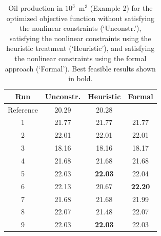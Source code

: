 \documentclass[twocolumn,numbook]{svjour3}          %
\begin{document}
\begin{table}
\centering
\caption{Oil production in $10^3$~m$^3$ (Example 2) for the optimized objective function
         without satisfying the nonlinear constraints (`Unconstr.'), satisfying the nonlinear constraints
         using the heuristic treatment (`Heuristic'), and satisfying the nonlinear constraints
         using the formal approach (`Formal'). Best feasible results shown in bold.}
\begin{tabular}{|c|c|c|c|}
\hline
  Run            &  Unconstr. & Heuristic & Formal      \\
\hline
Reference        & 20.29         &     20.28         & 	         \\
1 & 21.77      &     21.77         &       21.77    \\
2 & 22.01      &     22.01         &       22.01    \\
3 & 18.16      &     18.16         &       18.17    \\
4 & 21.68      &     21.68         &       21.68    \\
5 & 22.03      & \bf{22.03}      &       22.04    \\
6 & 22.13      &     20.67         &  \bf{22.20}    \\
7 & 21.68      &     21.68         &       21.99    \\
8 & 22.07      &     21.48         &       22.07    \\
9 & 22.03      & \bf{22.03}      &       22.03    \\
\hline
\end{tabular}
  \label{table:spe10top}
\end{table}

\end{document}

